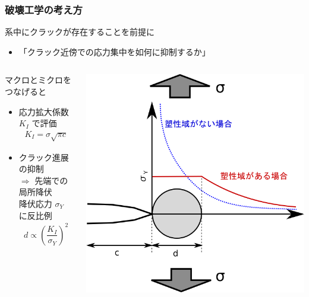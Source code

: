 \documentclass[10pt, dvipdfmx]{beamer}
\begin{document}
\begin{frame}
\frametitle{破壊工学の考え方}
\begin{exampleblock}{系中にクラックが存在することを前提に}

\begin{itemize}
\item
\alert{「クラック近傍での応力集中を如何に抑制するか」}
\end{itemize}
\end{exampleblock}

\begin{columns}[totalwidth=1\textwidth]
\begin{alertblock}{マクロとミクロをつなげると}
	\begin{itemize}
		\item
		\alert{応力拡大係数 $K_I$ で評価}
		\footnotesize
		\begin{align*}
		K_{I} = \sigma \sqrt{\pi c}
		\end{align*}
		\normalsize
		\item 
		クラック進展の抑制 \\
		$\Rightarrow$ 先端での\alert{局所降伏}\\
		降伏応力 $\sigma_Y$ に反比例
		\footnotesize
		\begin{align*}
		d \propto \left( \dfrac{K_I}{\sigma_Y} \right)^2
		\end{align*}
		\normalsize
	\end{itemize}
\end{alertblock}
	\centering
	\includegraphics[width=.9\textwidth]{yeild_crack.png}
\end{columns}
\end{frame}
\end{document}
